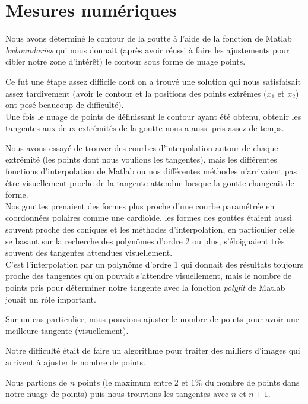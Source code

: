 \section{Mesures numériques}

Nous avons déterminé le contour de la goutte à l'aide de la fonction de Matlab \emph{bwboundaries} qui nous donnait (après avoir réussi à faire les ajustements pour cibler notre zone d'intérêt) le contour sous forme de nuage points.

Ce fut une étape assez difficile dont on a trouvé une solution qui nous satisfaisait assez tardivement (avoir le contour et la positions des points extrêmes ($x_{1}$ et $x_{2}$) ont posé beaucoup de difficulté).  \\

Une fois le nuage de points de définissant le contour ayant été obtenu, obtenir les tangentes aux deux extrémités de la goutte nous a aussi pris assez de temps.

Nous avons essayé de trouver des courbes d'interpolation autour de chaque extrémité (les points dont nous voulions les tangentes), mais les différentes fonctions d'interpolation de Matlab ou nos différentes méthodes n'arrivaient pas être visuellement proche de la tangente attendue lorsque la goutte changeait de forme.\\

Nos gouttes prenaient des formes plus proche d'une courbe paramétrée en coordonnées polaires comme une cardioïde, les formes des gouttes étaient aussi souvent proche des coniques et les méthodes d'interpolation, en particulier celle se basant sur la recherche des polynômes d'ordre 2 ou plus, s'éloignaient très souvent des tangentes attendues visuellement.\\

C'est l'interpolation par un polynôme d'ordre 1 qui donnait des résultats toujours proche des tangentes qu'on pouvait s'attendre visuellement, mais le nombre de points pris pour déterminer notre tangente avec la fonction \emph{polyfit} de Matlab jouait un rôle important.

Sur un cas particulier, nous pouvions ajuster le nombre de points pour avoir une meilleure tangente (visuellement).

Notre difficulté était de faire un algorithme pour traiter des milliers d'images qui arrivent à ajuster le nombre de points.

Nous partions de $n$ points (le maximum entre 2 et $1\%$ du nombre de points dans notre nuage de points) puis nous trouvions les tangentes avec $n$ et $n+1$.

